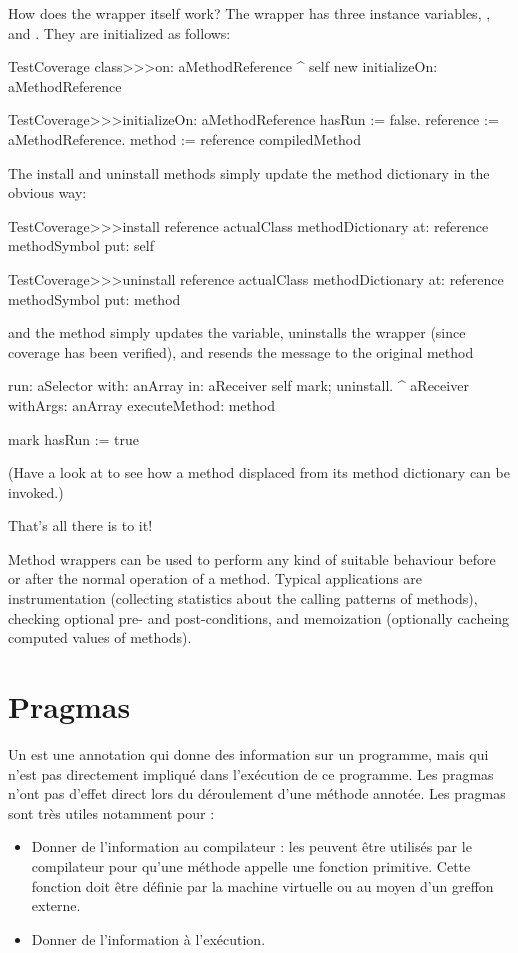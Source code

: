 \documentclass[a4paper,10pt,twoside]{book}
\begin{document}
How does the wrapper itself work?
The  wrapper has three instance variables, ,  and .
They are initialized as follows:
\begin{code}{}
TestCoverage class>>>on: aMethodReference
	^ self new initializeOn: aMethodReference

TestCoverage>>>initializeOn: aMethodReference
	hasRun := false.
	reference := aMethodReference.
	method := reference compiledMethod
\end{code}

The install and uninstall methods simply update the method dictionary in the obvious way:
\begin{code}{}
TestCoverage>>>install
	reference actualClass methodDictionary
		at: reference methodSymbol
		put: self

TestCoverage>>>uninstall
	reference actualClass methodDictionary
		at: reference methodSymbol
		put: method
\end{code}
\noindent
and the  method simply updates the  variable, uninstalls the wrapper (since coverage has been verified), and resends the message to the original method
\begin{code}{}
run: aSelector with: anArray in: aReceiver
	self mark; uninstall.
	^ aReceiver withArgs: anArray executeMethod: method

mark
	hasRun := true
\end{code}
(Have a look at  to see how a method displaced from its method dictionary can be invoked.)

That's all there is to it!

Method wrappers can be used to perform any kind of suitable behaviour before or after the normal operation of a method.  Typical applications are instrumentation (collecting statistics about the calling patterns of methods), checking optional pre- and post-conditions, and memoization (optionally cacheing computed values of methods).

\section{Pragmas}

Un  est une annotation qui donne des information sur un programme, mais qui n'est pas directement impliqué dans l'exécution de ce programme. Les pragmas n'ont pas d'effet direct lors du déroulement d'une méthode annotée.
Les pragmas sont très utiles notamment pour :
\begin{itemize}
\item Donner de l'information au compilateur : les  peuvent être utilisés par le compilateur pour qu'une méthode appelle une fonction primitive. Cette fonction doit être définie par la machine virtuelle ou au moyen d'un greffon externe.
\item Donner de l'information à l'exécution.
\end{itemize}
\end{document}

